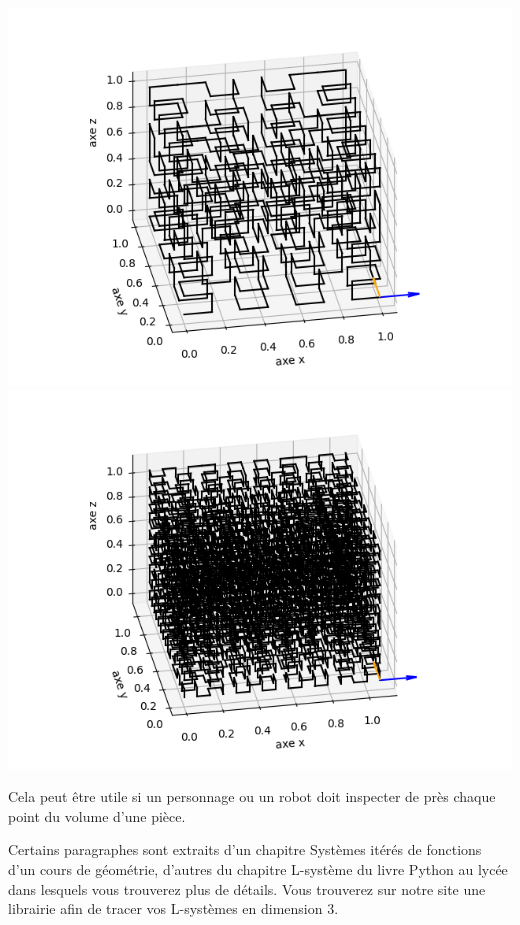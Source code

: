 \documentclass[11pt,class=report,crop=false]{standalone}
\begin{document}
\begin{center}
\includegraphics[scale=\myscale,scale=0.4]{figures/hilbert-3}\qquad
\includegraphics[scale=\myscale,scale=0.4]{figures/hilbert-4}
\end{center}

Cela peut être utile si un personnage ou un robot doit inspecter de près chaque point du volume d'une pièce.


\bigskip

Certains paragraphes sont extraits d'un chapitre
\og{}Systèmes itérés de fonctions\fg{} d'un cours de géométrie, d'autres du chapitre 
\og{}L-système\fg{} du livre \og{}Python au lycée\fg{} dans lesquels vous trouverez plus de détails.
Vous trouverez sur notre site une librairie  afin de tracer vos L-systèmes en dimension $3$.
\end{document}

